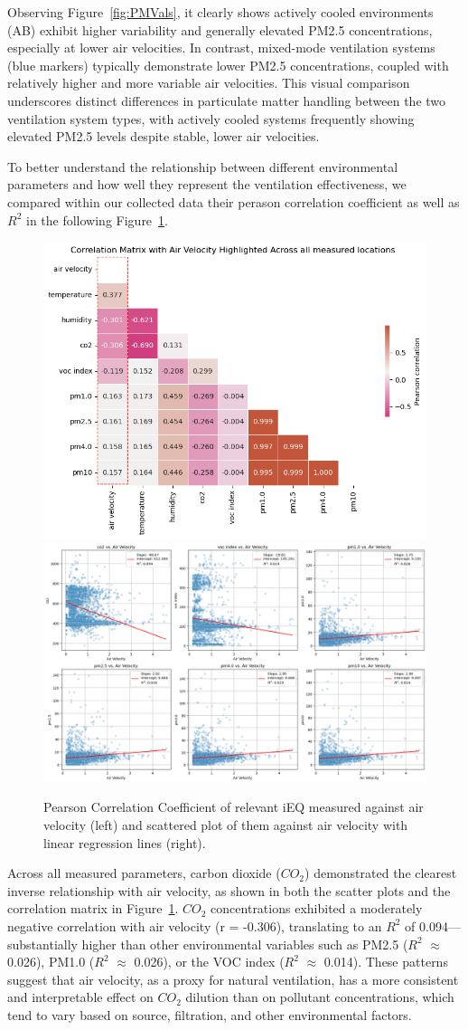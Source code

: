\documentclass[preprint,12pt]{elsarticle}
\begin{document}
Observing Figure~\ref{fig:PMVals}, it clearly shows actively cooled environments (AB) exhibit higher variability and generally elevated PM2.5 concentrations, especially at lower air velocities. In contrast, mixed-mode ventilation systems (blue markers) typically demonstrate lower PM2.5 concentrations, coupled with relatively higher and more variable air velocities. This visual comparison underscores distinct differences in particulate matter handling between the two ventilation system types, with actively cooled systems frequently showing elevated PM2.5 levels despite stable, lower air velocities.

To better understand the relationship between different environmental parameters and how well they represent the ventilation effectiveness, we compared within our collected data their perason correlation coefficient as well as $R^2$ in the following Figure~\ref{fig:trianglescatter}.

\begin{figure}[h!]
    \centering
    \includegraphics[width=0.45\linewidth]{img/aircorr.png}\includegraphics[width=0.55\linewidth]{img/co2scatter.png}
    \caption{Pearson Correlation Coefficient of relevant iEQ measured against air velocity (left) and scattered plot of them against air velocity with linear regression lines (right).}
    \label{fig:trianglescatter}
\end{figure}

Across all measured parameters, carbon dioxide ($CO_2$) demonstrated the clearest inverse relationship with air velocity, as shown in both the scatter plots and the correlation matrix in Figure~\ref{fig:trianglescatter}. $CO_2$ concentrations exhibited a moderately negative correlation with air velocity (r = -0.306), translating to an $R^2$ of 0.094—substantially higher than other environmental variables such as PM2.5 ($R^2$ $\approx$ 0.026), PM1.0 ($R^2$ $\approx $ 0.026), or the VOC index ($R^2$ $\approx$ 0.014). These patterns suggest that air velocity, as a proxy for natural ventilation, has a more consistent and interpretable effect on $CO_2$ dilution than on pollutant concentrations, which tend to vary based on source, filtration, and other environmental factors.
\end{document}
